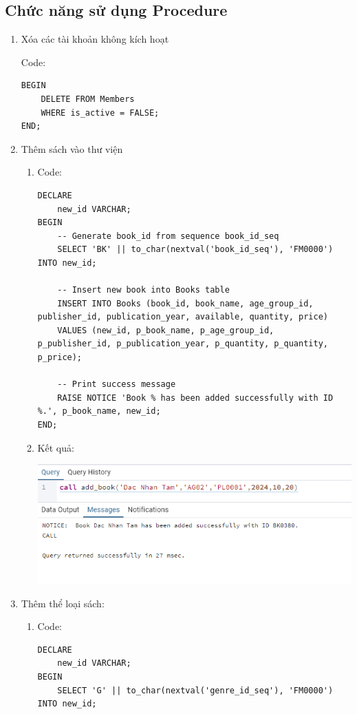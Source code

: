 \documentclass[12pt]{article}
\begin{document}
\subsection{Chức năng sử dụng Procedure}
\begin{enumerate}
    \item Xóa các tài khoản không kích hoạt
    \begin{enumerate}
        Code:
        \begin{lstlisting}
BEGIN
    DELETE FROM Members
    WHERE is_active = FALSE;
END;
        \end{lstlisting}
    \end{enumerate}
    \item Thêm sách vào thư viện
    \begin{enumerate}
        \item  Code:
        \begin{lstlisting}
DECLARE
    new_id VARCHAR;
BEGIN
    -- Generate book_id from sequence book_id_seq
    SELECT 'BK' || to_char(nextval('book_id_seq'), 'FM0000') INTO new_id;

    -- Insert new book into Books table
    INSERT INTO Books (book_id, book_name, age_group_id, publisher_id, publication_year, available, quantity, price)
    VALUES (new_id, p_book_name, p_age_group_id, p_publisher_id, p_publication_year, p_quantity, p_quantity, p_price);

    -- Print success message
    RAISE NOTICE 'Book % has been added successfully with ID %.', p_book_name, new_id;
END;
        \end{lstlisting}
        \item Kết quả:

    \includegraphics[width=0.8\linewidth]{image.png}
    \end{enumerate}
    \item Thêm thể loại sách:
    \begin{enumerate}
        \item  Code:
        \begin{lstlisting}
DECLARE
    new_id VARCHAR;
BEGIN
    SELECT 'G' || to_char(nextval('genre_id_seq'), 'FM0000') INTO new_id;


\end{lstlisting}
\end{enumerate}
\end{enumerate}
\end{document}
